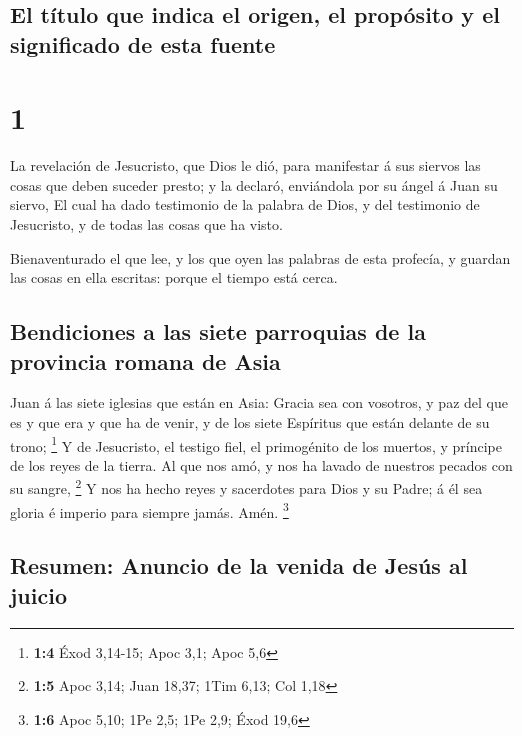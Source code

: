 \hypertarget{el-tuxedtulo-que-indica-el-origen-el-propuxf3sito-y-el-significado-de-esta-fuente}{%
\subsection{El título que indica el origen, el propósito y el
significado de esta
fuente}\label{el-tuxedtulo-que-indica-el-origen-el-propuxf3sito-y-el-significado-de-esta-fuente}}

\hypertarget{section}{%
\section{1}\label{section}}

 La revelación de Jesucristo, que Dios le dió, para
manifestar á sus siervos las cosas que deben suceder presto; y la
declaró, enviándola por su ángel á Juan su siervo,  El cual
ha dado testimonio de la palabra de Dios, y del testimonio de
Jesucristo, y de todas las cosas que ha visto.

 Bienaventurado el que lee, y los que oyen las palabras de
esta profecía, y guardan las cosas en ella escritas: porque el tiempo
está cerca.

\hypertarget{bendiciones-a-las-siete-parroquias-de-la-provincia-romana-de-asia}{%
\subsection{Bendiciones a las siete parroquias de la provincia romana de
Asia}\label{bendiciones-a-las-siete-parroquias-de-la-provincia-romana-de-asia}}

 Juan á las siete iglesias que están en Asia: Gracia sea con
vosotros, y paz del que es y que era y que ha de venir, y de los siete
Espíritus que están delante de su trono; \footnote{\textbf{1:4} Éxod
  3,14-15; Apoc 3,1; Apoc 5,6}  Y de Jesucristo, el testigo
fiel, el primogénito de los muertos, y príncipe de los reyes de la
tierra. Al que nos amó, y nos ha lavado de nuestros pecados con su
sangre, \footnote{\textbf{1:5} Apoc 3,14; Juan 18,37; 1Tim 6,13; Col
  1,18}  Y nos ha hecho reyes y sacerdotes para Dios y su
Padre; á él sea gloria é imperio para siempre jamás. Amén. \footnote{\textbf{1:6}
  Apoc 5,10; 1Pe 2,5; 1Pe 2,9; Éxod 19,6}

\hypertarget{resumen-anuncio-de-la-venida-de-jesuxfas-al-juicio}{%
\subsection{Resumen: Anuncio de la venida de Jesús al
juicio}\label{resumen-anuncio-de-la-venida-de-jesuxfas-al-juicio}}


